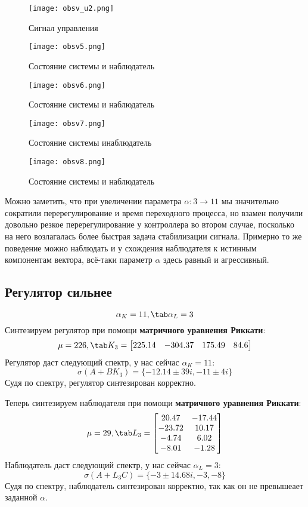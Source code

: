 \newpage
\begin{figure}[ht]
  \centering
  \texttt{[image: obsv\_u2.png]}
  \caption{Сигнал управления}
\end{figure}
\begin{figure}[ht]
  \centering
  \texttt{[image: obsv5.png]}
  \caption{Состояние системы и наблюдатель}
\end{figure}
\newpage
\begin{figure}[ht]
  \centering
  \texttt{[image: obsv6.png]}
  \caption{Состояние системы и наблюдатель}
\end{figure}
\begin{figure}[ht]
  \centering
  \texttt{[image: obsv7.png]}
  \caption{Состояние системы инаблюдатель}
\end{figure}
\newpage
\begin{figure}[ht]
  \centering
  \texttt{[image: obsv8.png]}
  \caption{Состояние системы и наблюдатель}
\end{figure}
Можно заметить, что при увеличении параметра $\alpha: 3 \rightarrow 11$ мы значительно сократили перерегулирование и время переходного процесса, 
но взамен получили довольно резкое перерегулирование у контроллера во втором случае, посколько на него возлагалась более быстрая задача стабилизации сигнала. 
Примерно то же поведение можно наблюдать и у схождения наблюдателя к истинным компонентам вектора, всё-таки параметр $\alpha$ здесь равный и агрессивный.
\newpage
\subsection{Регулятор сильнее}
$$
  \alpha_K = 11, \tab \alpha_L = 3
$$
Синтезируем регулятор при помощи \textbf{матричного уравнения Риккати}:
$$
\mu = 226, \tab K_3 = \begin{bmatrix}
  225.14 & -304.37 & 175.49 & 84.6 \\
\end{bmatrix}
$$
Регулятор даст следующий спектр, у нас сейчас $\alpha_K = 11$:
$$
  \sigma(A+BK_3) =\{ -12.14 \pm 39i, -11 \pm 4i \}
$$
Судя по спектру, регулятор синтезирован корректно. 

Теперь синтезируем наблюдателя при помощи \textbf{матричного уравнения Риккати}:
$$
\mu = 29, \tab L_3 = \begin{bmatrix}
  20.47 & -17.44 \\
  -23.72 & 10.17 \\
  -4.74 & 6.02 \\
  -8.01 & -1.28 \\
\end{bmatrix}
$$
Наблюдатель даст следующий спектр, у нас сейчас $\alpha_L = 3$:
$$
  \sigma(A+L_3 C) = \{-3 \pm 14.68i, -3 , -8  \}
$$
Судя по спектру, наблюдатель синтезирован корректно, так как он не превышеает заданной $\alpha$.


